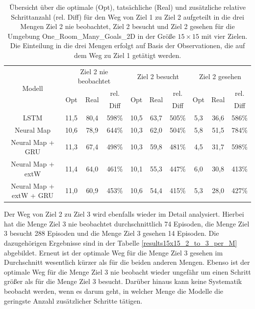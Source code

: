 \begin{table}
  \begin{tabular}{|c|c|c|c|c|c|c|c|c|c|}
    \hline
    \multirow{3}{*}{Modell} & \multicolumn{3}{|c|}{Ziel 2 nie beobachtet} & \multicolumn{3}{|c|}{Ziel 2 besucht} & \multicolumn{3}{|c|}{Ziel 2 gesehen} \\ \cline{2-10}
    & \multirow{2}{*}{Opt} & \multirow{2}{*}{Real} & rel. & \multirow{2}{*}{Opt} & \multirow{2}{*}{Real} & rel. & \multirow{2}{*}{Opt} & \multirow{2}{*}{Real} & rel. \\
    & & & Diff & & & Diff & & & Diff \\ \hline
    LSTM & 11,5 & 80,4 & 598\% & 10,5 & 63,7 & 505\% & 5,3 & 36,6 & 586\% \\ \hline
    Neural Map & 10,6 & 78,9 & 644\% & 10,3 & 62,0 & 504\% & 5,8 & 51,5 & 784\% \\ \hline
    Neural Map + GRU & 11,3 & 67,4 & 498\% & 10,3 & 59,8 & 481\% & 4,5 & 31,7 & 598\% \\ \hline
    Neural Map + extW & 11,4 & 64,0 & 461\% & 10,1 & 55,3 & 447\% & 6,0 & 30,8 & 413\% \\ \hline
    Neural Map + extW + GRU & 11,0 & 60,9 & 453\% & 10,6 & 54,4 & 415\% & 5,3 & 28,0 & 427\% \\ \hline
  \end{tabular}
  \caption{Übersicht über die optimale (Opt), tatsächliche (Real) und zusätzliche relative Schrittanzahl (rel. Diff) für den Weg von Ziel 1 zu Ziel 2 aufgeteilt in die drei Mengen \glqq Ziel 2 nie beobachtet\grqq{}, \glqq Ziel 2 besucht\grqq{} und \glqq Ziel 2 gesehen\grqq{} für die Umgebung \glqq One\_Room\_Many\_Goals\_2D\grqq{} in der Größe $15 \times 15$ mit vier Zielen. Die Einteilung in die drei Mengen erfolgt auf Basis der Observationen, die auf dem Weg zu Ziel 1 getätigt werden.}
  \label{results15x15_1_to_2_per_M}
\end{table}

Der Weg von Ziel 2 zu Ziel 3 wird ebenfalls wieder im Detail analysiert. Hierbei hat die Menge \glqq Ziel 3 nie beobachtet\grqq{} durchschnittlich 74 Episoden, die Menge \glqq Ziel 3 besucht\grqq{} 288 Episoden und die Menge \glqq Ziel 3 gesehen\grqq{} 14 Episoden. Die dazugehörigen Ergebnisse sind in der Tabelle \ref{results15x15_2_to_3_per_M} abgebildet. Erneut ist der optimale Weg für die Menge \glqq Ziel 3 gesehen\grqq{} im Durchschnitt wesentlich kürzer als für die beiden anderen Mengen. Ebenso ist der optimale Weg für die Menge \glqq Ziel 3 nie beobacht\grqq{} wieder ungefähr um einen Schritt größer als für die Menge \glqq Ziel 3 besucht\grqq{}. Darüber hinaus kann keine Systematik beobacht werden, wenn es darum geht, in welcher Menge die Modelle die geringste Anzahl zusätzlicher Schritte tätigen.

